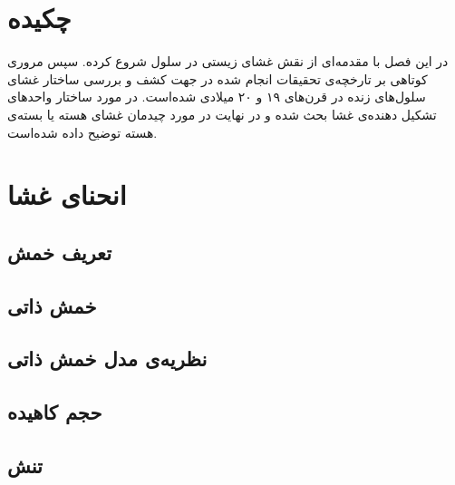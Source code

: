 \setRL
\clearpage

\def \MemTB {\Mempath /MembraneTheoreticalBackground}

\section{
چکیده
}
در این فصل با مقدمه‌ای از نقش غشای زیستی در سلول شروع کرده. سپس مروری کوتاهی بر تارخچه‌ی تحقیقات انجام شده در جهت کشف و بررسی ساختار غشای سلول‌های زنده در قرن‌های ۱۹ و ۲۰ میلادی شده‌است. در مورد ساختار واحد‌های تشکیل دهنده‌ی غشا بحث شده و در نهایت در مورد چیدمان غشای هسته یا بسته‌ی هسته توضیح داده شده‌است.

\section{
انحنای غشا
}
\subsection{
تعریف خمش
}


\subsection{
خمش ذاتی
}


\subsection{
نظریه‌ی مدل خمش ذاتی
}

\subsection{
حجم کاهیده
}

\subsection{
تنش 
}











